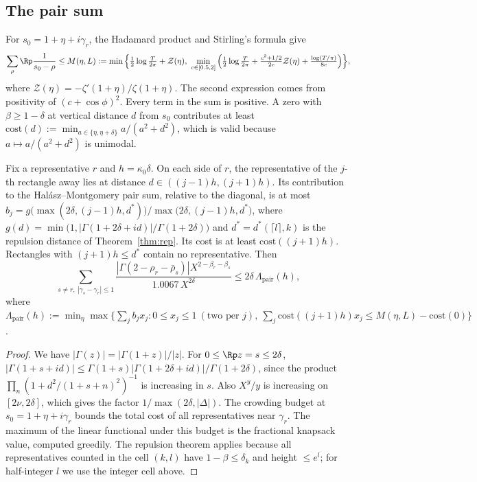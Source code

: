 \subsection{The pair sum}
For $s_0 = 1 + \eta + i\gamma_r$, the Hadamard product and Stirling's formula give
\[
\sum_\rho\Rp\frac{1}{s_0-\rho} \le M(\eta, L) := \min\Big\{\tfrac12\log\tfrac{T}{2\pi} + \mathcal Z(\eta),\ \min_{c\in[0.5,2]}\Big(\tfrac12\log\tfrac T{2\pi} + \tfrac{c^2+1/2}{2c}\mathcal Z(\eta) + \tfrac{\log(T/\pi)}{8c}\Big)\Big\},
\]
where $\mathcal Z(\eta) = -\zeta'(1+\eta)/\zeta(1+\eta)$.
The second expression comes from positivity of $(c + \cos\phi)^2$.
Every term in the sum is positive.
A zero with $\beta \ge 1-\delta$ at vertical distance $d$ from $s_0$ contributes at least
$\mathrm{cost}(d) := \min_{a\in\{\eta, \eta+\delta\}} a/(a^2+d^2)$,
which is valid because $a\mapsto a/(a^2+d^2)$ is unimodal.

\begin{lemma}\label{lem:pair}
Fix a representative $r$ and $h = \kappa_0\delta$.
On each side of $r$, the representative of the $j$-th rectangle away lies at distance $d \in ((j-1)h, (j+1)h)$.
Its contribution to the Hal\'asz--Montgomery pair sum, relative to the diagonal, is at most
$b_j = g\big(\max(2\delta, (j-1)h, d^*)\big)/\max\big(2\delta, (j-1)h, d^*\big)$, where
$g(d) = \min\big(1, |\Gamma(1+2\delta+id)|/\Gamma(1+2\delta)\big)$ and $d^* = d^*(\lceil l\rceil, k)$ is the repulsion distance of Theorem~\ref{thm:rep}.
Its cost is at least $\mathrm{cost}((j+1)h)$.
Rectangles with $(j+1)h \le d^*$ contain no representative.
Then
\[
\sum_{s\ne r,\ |\gamma_s - \gamma_r| \le 1}\frac{|\Gamma(2-\rho_r-\bar\rho_s)|X^{2-\beta_r-\beta_s}}{1.0067\,X^{2\delta}} \le 2\delta\,\Lambda_{\mathrm{pair}}(h),
\]
where $\Lambda_{\mathrm{pair}}(h) := \min_\eta\max\big\{\sum_j b_jx_j : 0\le x_j\le 1 \ (\text{two per } j),\ \sum_j\mathrm{cost}((j+1)h)x_j \le M(\eta,L) - \mathrm{cost}(0)\big\}$.
\end{lemma}

\begin{proof}
We have $|\Gamma(z)| = |\Gamma(1+z)|/|z|$.
For $0\le\Rp z = s\le2\delta$, $|\Gamma(1+s+id)| \le \Gamma(1+s)|\Gamma(1+2\delta+id)|/\Gamma(1+2\delta)$, since the product $\prod_n(1+d^2/(1+s+n)^2)^{-1}$ is increasing in $s$.
Also $X^y/y$ is increasing on $[2\nu, 2\delta]$, which gives the factor $1/\max(2\delta, |\Delta|)$.
The crowding budget at $s_0 = 1+\eta+i\gamma_r$ bounds the total cost of all representatives near $\gamma_r$.
The maximum of the linear functional under this budget is the fractional knapsack value, computed greedily.
The repulsion theorem applies because all representatives counted in the cell $(k,l)$ have $1-\beta\le\delta_k$ and height $\le e^l$; for half-integer $l$ we use the integer cell above.
\end{proof}

